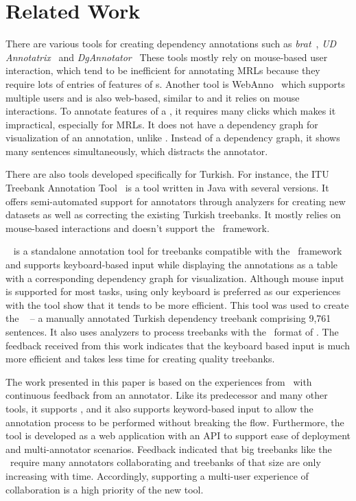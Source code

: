 \section{Related Work}
\label{sec:related}

There are various tools for creating dependency annotations such as \textit{brat}~\cite{brat}, \textit{UD Annotatrix}~\cite{tyers-etal:2018} and \textit{DgAnnotator}~\cite{dgannotator}
These tools mostly rely on mouse-based user interaction, which tend to be inefficient for annotating MRLs because they require lots of entries of features of \form s.
Another tool is WebAnno~\cite{webanno} which supports multiple users and is also web-based, similar to \boatvtwo and it relies on mouse interactions. %
To annotate features of a \form, it requires many clicks which makes it impractical, especially for MRLs.
It does not have a dependency graph for visualization of an annotation, unlike \boatvone. Instead of a dependency graph, it shows many sentences simultaneously, which distracts the annotator.

There are also tools developed specifically for Turkish.
For instance, the ITU Treebank Annotation Tool~\cite{pamay-etal-2015-annotation} is a tool written in Java with several versions.
It offers semi-automated support for annotators through analyzers for creating new datasets as well as correcting the existing Turkish treebanks.
It mostly relies on mouse-based interactions and doesn't support the \ud\ framework. 

\boatvone~\cite{turk-etal-2019-turkish} is a standalone annotation tool for treebanks compatible with the \ud\ framework~\cite{UD} and supports keyboard-based input while displaying the annotations as a table with a corresponding dependency graph for visualization.
Although mouse input is supported for most tasks, using only keyboard is preferred as our experiences with the tool show that it tends to be more efficient.
This tool was used to create the \bountreebank~\cite{trk2020resources,UD-Boun-Treebank} -- a manually annotated Turkish dependency treebank comprising 9,761 sentences.
It also uses analyzers to process treebanks with the \conllu\ format of \ud. 
The feedback received from this work indicates that the keyboard based input is much more efficient and takes less time for creating quality treebanks.

The work presented in this paper is based on the experiences from \boatvone\ with continuous feedback from an annotator. 
Like its predecessor and many other tools, it supports \ud, and it also supports keyword-based input to allow the annotation process to be performed without breaking the flow. 
Furthermore, the tool is developed as a web application with an API to support ease of deployment and multi-annotator scenarios. 
Feedback indicated that big treebanks like the \bountreebank\ require many annotators collaborating and treebanks of that size are only increasing with time.
Accordingly, supporting a multi-user experience of collaboration is a high priority of the new tool.